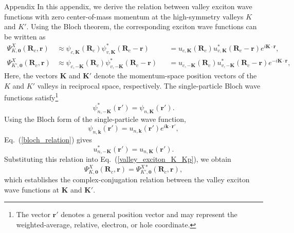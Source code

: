 \begin{Appx}{Appendix}
In this appendix, we derive the relation between valley exciton wave functions with zero center-of-mass momentum at the high-symmetry valleys $K$ and $K'$. Using the Bloch theorem, the corresponding exciton wave functions can be written as
\begin{equation}
\begin{aligned}
\Psi^{X}_{K,\boldsymbol{0}}(\boldsymbol{R}_c,\boldsymbol{r})
&\approx
\psi_{c,\boldsymbol{K}}(\boldsymbol{R}_c)
\psi^{*}_{v,\boldsymbol{K}}(\boldsymbol{R}_c-\boldsymbol{r})
&&=
u_{c,\boldsymbol{K}}(\boldsymbol{R}_c)
u^{*}_{v,\boldsymbol{K}}(\boldsymbol{R}_c-\boldsymbol{r})
e^{i\boldsymbol{K}\cdot\boldsymbol{r}},
\\[0.5em]
\Psi^{X}_{K',\boldsymbol{0}}(\boldsymbol{R}_c,\boldsymbol{r})
&\approx
\psi_{c,-\boldsymbol{K}}(\boldsymbol{R}_c)
\psi^{*}_{v,-\boldsymbol{K}}(\boldsymbol{R}_c-\boldsymbol{r})
&&=
u_{c,-\boldsymbol{K}}(\boldsymbol{R}_c)
u^{*}_{v,-\boldsymbol{K}}(\boldsymbol{R}_c-\boldsymbol{r})
e^{-i\boldsymbol{K}\cdot\boldsymbol{r}},
\end{aligned}
\label{valley_exciton_K_Kp}
\end{equation}
Here, the vectors $\boldsymbol{K}$ and $\boldsymbol{K}'$ denote the momentum-space position vectors of the $K$ and $K'$ valleys in reciprocal space, respectively. The single-particle Bloch wave functions satisfy\footnote{The vector $\boldsymbol{r}'$ denotes a general position vector and may represent the weighted-average, relative, electron, or hole coordinate.}
\begin{equation}
\psi^{*}_{n,-\boldsymbol{K}}(\boldsymbol{r}')
=
\psi_{n,\boldsymbol{K}}(\boldsymbol{r}').
\label{bloch_relation}
\end{equation}
Using the Bloch form of the single-particle wave function,
\begin{equation}
\psi_{n,\boldsymbol{k}}(\boldsymbol{r}')
=
u_{n,\boldsymbol{k}}(\boldsymbol{r}')
e^{i\boldsymbol{k}\cdot\boldsymbol{r}'},
\end{equation}
Eq.~(\ref{bloch_relation}) gives
\begin{equation}
u^{*}_{n,-\boldsymbol{K}}(\boldsymbol{r}')
=
u_{n,\boldsymbol{K}}(\boldsymbol{r}').
\end{equation}
Substituting this relation into Eq.~(\ref{valley_exciton_K_Kp}), we obtain
\begin{equation}
\Psi^{X}_{K,\boldsymbol{0}}(\boldsymbol{R}_c,\boldsymbol{r})
=
\Psi^{X*}_{K',\boldsymbol{0}}(\boldsymbol{R}_c,\boldsymbol{r}),
\end{equation}
which establishes the complex-conjugation relation between the valley exciton wave functions at $\boldsymbol{K}$ and $\boldsymbol{K}'$.






\end{Appx}